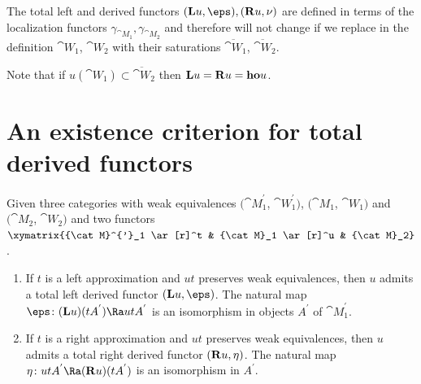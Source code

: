 The total left and derived functors $({\bf L}u, \eps), ({\bf R}u, \nu)$ are defined in terms of the localization functors $\gamma_{{\cat M}_1}, \gamma_{{\cat M}_2}$ and therefore will not change if we replace in the definition ${\cat W}_1$, ${\cat W}_2$ with their saturations $\overline{\cat W}_1$, $\overline{\cat W}_2$.

Note that if $u({\cat W}_1) \subset \overline{\cat W}_2$ then ${\bf L}u = {\bf R}u = {\bf ho}u$.

\section{An existence criterion for total derived functors}

\begin{thm}
\label{thm:generalexistenceleftderived}
Given three categories with weak equivalences $({\cat M}^{'}_1$, ${\cat W}^{'}_1)$, $({\cat M}_1$, ${\cat W}_1)$ and $({\cat M}_2$, ${\cat W}_2)$ and two functors $\xymatrix {{\cat M}^{'}_1 \ar[r]^t & {\cat M}_1 \ar[r]^u & {\cat M}_2}$.
\begin{enumerate}
\item
If $t$ is a left approximation and $ut$ preserves weak equivalences, then $u$ admits a total left derived functor $({\bf L}u, \eps)$. The natural map $\eps \colon ({\bf L}u)(tA^{'}) \Ra utA^{'}$ is an isomorphism in objects $A^{'}$ of ${\cat M}^{'}_1$.
\item
If $t$ is a right approximation and $ut$ preserves weak equivalences, then $u$ admits a total right derived functor $({\bf R}u, \eta)$. The natural map $\eta \colon utA^{'} \Ra ({\bf R}u)(tA^{'})$ is an isomorphism in $A^{'}$.
\end{enumerate}
\end{thm}

